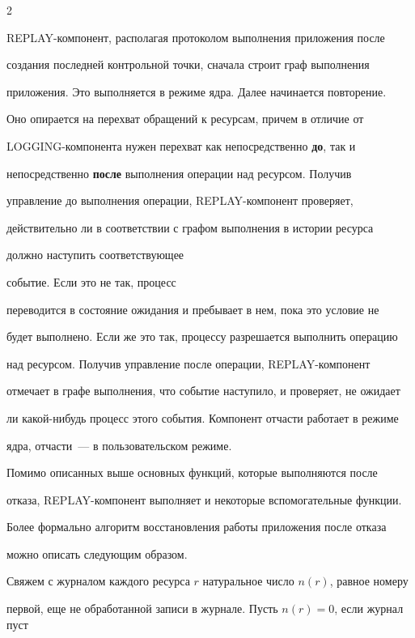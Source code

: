 \begin{multicols}{2}
\begin{enumerate}[(1)]
\end{enumerate}



REPLAY-компонент, располагая протоколом выполнения приложения после

создания последней контрольной точки, сначала строит граф выполнения

приложения. Это выполняется в режиме ядра. Далее начинается повторение.

Оно опирается на перехват обращений к ресурсам, причем в отличие от

LOGGING-компонента нужен пере\-хват как непосредственно \textbf{до}, так и

не\-по\-средст\-вен\-но \textbf{после}  выполнения операции над ресур\-сом. Получив

управление до выполнения операции, REPLAY-компонент проверяет,

действительно ли в соответствии с графом выполнения в истории ресурса

должно наступить соответствующее

 событие. Если это не так, процесс

переводится в со\-сто\-яние ожидания и пребывает в нем, пока это условие не

будет выполнено. Если же это так, процессу разрешается выполнить операцию

над ресурсом. Получив управление после операции, REPLAY-компонент

отмечает в графе выполнения, что событие наступило, и проверяет, не ожидает

ли какой-нибудь процесс этого события. Компонент отчасти работает в режиме

ядра, отчасти~--- в пользовательском режиме.



Помимо описанных выше основных функций, которые выполняются  после

отказа, REPLAY-компонент выполняет и некоторые вспомогательные функции.



Более формально алгоритм восстановления работы приложения после отказа

можно описать следующим образом.



Свяжем с журналом каждого ресурса $r$ натуральное число $n(r)$, равное номеру 

первой, еще не обработанной записи в журнале. Пусть $n(r) =0$, если журнал пуст 


\end{multicols}

